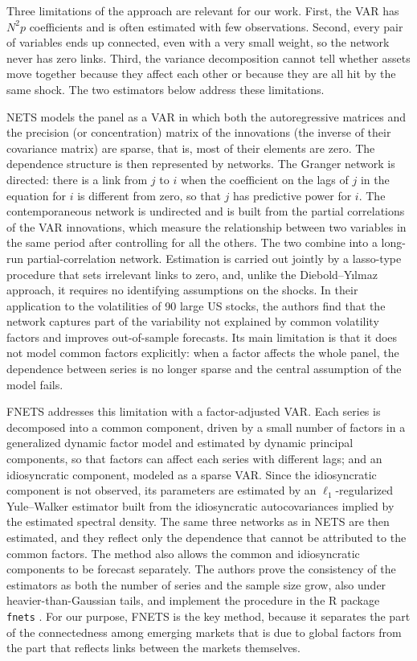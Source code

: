 Three limitations of the approach are relevant for our work. First, the VAR has $N^2p$ coefficients and is often estimated with few observations. Second, every pair of variables ends up connected, even with a very small weight, so the network never has zero links. Third, the variance decomposition cannot tell whether assets move together because they affect each other or because they are all hit by the same shock. The two estimators below address these limitations.

NETS \citep{barigozzi2019nets} models the panel as a VAR in which both the autoregressive matrices and the precision (or concentration) matrix of the innovations (the inverse of their covariance matrix) are sparse, that is, most of their elements are zero. The dependence structure is then represented by networks. The Granger network is directed: there is a link from $j$ to $i$ when the coefficient on the lags of $j$ in the equation for $i$ is different from zero, so that $j$ has predictive power for $i$. The contemporaneous network is undirected and is built from the partial correlations of the VAR innovations, which measure the relationship between two variables in the same period after controlling for all the others. The two combine into a long-run partial-correlation network. Estimation is carried out jointly by a lasso-type procedure that sets irrelevant links to zero, and, unlike the Diebold--Y{\i}lmaz approach, it requires no identifying assumptions on the shocks. In their application to the volatilities of 90 large US stocks, the authors find that the network captures part of the variability not explained by common volatility factors and improves out-of-sample forecasts. Its main limitation is that it does not model common factors explicitly: when a factor affects the whole panel, the dependence between series is no longer sparse and the central assumption of the model fails.

FNETS \citep{barigozzi2024fnets} addresses this limitation with a factor-adjusted VAR. Each series is decomposed into a common component, driven by a small number of factors in a generalized dynamic factor model \citep{forni2000generalized} and estimated by dynamic principal components, so that factors can affect each series with different lags; and an idiosyncratic component, modeled as a sparse VAR. Since the idiosyncratic component is not observed, its parameters are estimated by an $\ell_1$-regularized Yule--Walker estimator built from the idiosyncratic autocovariances implied by the estimated spectral density. The same three networks as in NETS are then estimated, and they reflect only the dependence that cannot be attributed to the common factors. The method also allows the common and idiosyncratic components to be forecast separately. The authors prove the consistency of the estimators as both the number of series and the sample size grow, also under heavier-than-Gaussian tails, and implement the procedure in the R package \texttt{fnets} \citep{owens2024fnetsR}. For our purpose, FNETS is the key method, because it separates the part of the connectedness among emerging markets that is due to global factors from the part that reflects links between the markets themselves.
